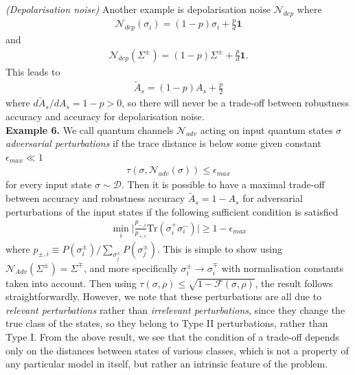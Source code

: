 \documentclass[onecolumn,prx, superscriptaddress,longbibliography,margin=1mm 11pt]{revtex4-2}
\renewcommand{\mathbf}[1]{\boldsymbol{#1}}
\begin{document}
\noindent \textit{(Depolarisation noise)} Another example is depolarisation noise $\mathcal{N}_{dep}$ where 
\begin{align}
\mathcal{N}_{dep}(\sigma_i)=(1-p)\sigma_i+\frac{p}{d}\mathbf{1}
\end{align}
and
\begin{align}
   \mathcal{N}_{dep}(\Sigma^{\pm})=(1-p)\Sigma^{\pm}+\frac{p}{d}\mathbf{1}.
\end{align}
This leads to 
\begin{align}
    \tilde{A}_s=(1-p)A_s+\frac{p}{2}
\end{align}
where $d\tilde{A}_s/dA_s=1-p>0$, so there will never be a trade-off between robustness accuracy and accuracy for depolarisation noise. \\

\noindent \textbf{Example 6.}
    We call quantum channels $\mathcal{N}_{adv}$ acting on input quantum states $\sigma$ \textit{adversarial perturbations} if the trace distance is below some given constant $\epsilon_{max} \ll 1$
\begin{align}
    \tau(\sigma, \mathcal{N}_{adv}(\sigma)) \leq \epsilon_{max} 
\end{align}
for every input state $\sigma \sim \mathcal{D}$. Then it is possible to have a maximal trade-off between accuracy and  robustness accuracy $\tilde{A}_s=1-A_s$ for adversarial perturbations of the input states if the following sufficient condition is satisfied
\begin{align}
    \min_i \vert \frac{p_{-,i}}{p_{+,i}}\text{Tr}(\sigma_i^+ \sigma_i^-)\vert \geq 1-\epsilon_{max}
\end{align}
where $p_{\pm, i} \equiv P(\sigma^{\pm}_i)/\sum_{\sigma_j^{\pm}}P(\sigma^{\pm}_j)$. This is simple to show using $\mathcal{N}_{Adv}(\Sigma^{\pm})=\Sigma^{\mp}$, and more specifically $\sigma_i^{\pm} \rightarrow \sigma_i^{\mp}$ with normalisation constants taken into account. Then using $\tau(\sigma,\rho) \leq \sqrt{1-\mathcal{F}(\sigma, \rho)}$, the result follows straightforwardly. However, we note that these perturbations are all due to \textit{relevant perturbations} rather than \textit{irrelevant perturbations}, since they change the true class of the states, so they belong to Type II perturbations, rather than Type I. From the above result, we see that the condition of a trade-off depends only on the distances between states of various classes, which is not a property of any particular model in itself, but rather an intrinsic feature of the problem.\\
\end{document}
